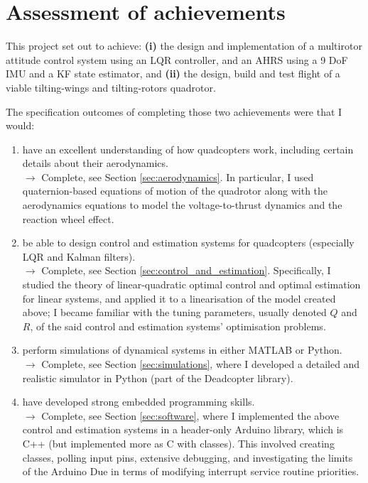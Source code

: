 \section{Assessment of achievements}
This project set out to achieve: \textbf{(i)} the design and implementation of a multirotor attitude control system using an \ac{LQR} controller, and an \ac{AHRS} using a 9 \ac{DoF} \ac{IMU} and a \ac{KF} state estimator, and \textbf{(ii)} the design, build and test flight of a viable tilting-wings and tilting-rotors quadrotor.

The specification outcomes of completing those two achievements were that I would:
\begin{enumerate}
    \item have an excellent understanding of how quadcopters work, including certain details about their aerodynamics. \\$\rightarrow$ \textcolor{green!80!black}{Complete}, see Section \ref{sec:aerodynamics}. In particular, I used quaternion-based equations of motion of the quadrotor along with the aerodynamics equations to model the voltage-to-thrust dynamics and the reaction wheel effect.
    \item be able to design control and estimation systems for quadcopters (especially LQR and Kalman filters). \\$\rightarrow$ \textcolor{green!60!black}{Complete}, see Section \ref{sec:control_and_estimation}. Specifically, I studied the theory of linear-quadratic optimal control and optimal estimation for linear systems, and applied it to a linearisation of the model created above; I became familiar with the tuning parameters, usually denoted $Q$ and $R$, of the said control and estimation systems' optimisation problems.
    \item perform simulations of dynamical systems in either MATLAB or Python. \\$\rightarrow$ \textcolor{green!60!black}{Complete}, see Section \ref{sec:simulations}, where I developed a detailed and realistic simulator in Python (part of the Deadcopter library).
    \item have developed strong embedded programming skills. \\$\rightarrow$ \textcolor{green!60!black}{Complete}, see Section \ref{sec:software}, where I implemented the above control and estimation systems in a header-only Arduino library, which is C++ (but implemented more as C with classes). This involved creating classes, polling input pins, extensive debugging, and investigating the limits of the Arduino Due in terms of modifying interrupt service routine priorities.

\end{enumerate}
